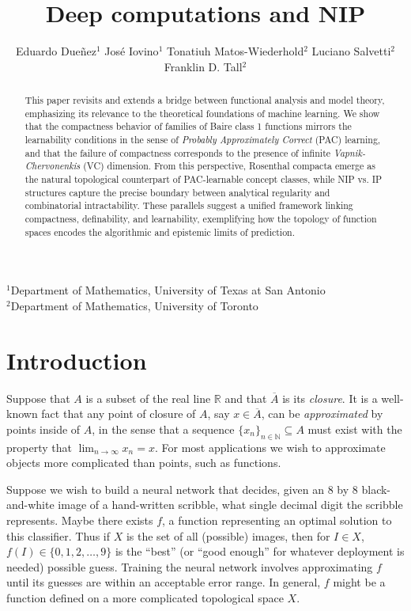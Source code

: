 \documentclass[psamsfonts]{amsart}
\title{Deep computations and NIP}
\author[Dueñez, Iovino, Matos-Wiederhold, Salvetti, Tall]{
Eduardo Dueñez$^{1}$ \qquad
José Iovino$^{1}$ \qquad
Tonatiuh Matos-Wiederhold$^{2}$ \qquad
Luciano Salvetti$^{2}$ \qquad
Franklin D. Tall$^{2}$
}
\theoremstyle{definition}
\theoremstyle{remark}
\numberwithin{equation}{section}
\begin{document}
\maketitle

{\centering\tiny\vspace{-0.6cm}
$^{1}$Department of Mathematics, University of Texas at San Antonio\\
$^{2}$Department of Mathematics, University of Toronto\\
}

\begin{abstract}
This paper revisits and extends a bridge between functional analysis and model theory, emphasizing its relevance to the theoretical foundations of machine learning. We show that the compactness behavior of families of Baire class 1 functions mirrors the learnability conditions in the sense of \emph{Probably Approximately Correct} (PAC) learning, and that the failure of compactness corresponds to the presence of infinite \emph{Vapnik-Chervonenkis} (VC) dimension. From this perspective, Rosenthal compacta emerge as the natural topological counterpart of PAC-learnable concept classes, while NIP vs. IP structures capture the precise boundary between analytical regularity and combinatorial intractability. These parallels suggest a unified framework linking compactness, definability, and learnability, exemplifying how the topology of function spaces encodes the algorithmic and epistemic limits of prediction.
\end{abstract}

\maketitle

\section{Introduction}

Suppose that $A$ is a subset of the real line $\mathbb R$ and that $\overline A$ is its \emph{closure}. It is a well-known fact that any point of closure of $A$, say $x\in\overline A$, can be \emph{approximated} by points inside of $A$, in the sense that a sequence $\{x_n\}_{n\in\mathbb N}\subseteq A$ must exist with the property that $\lim_{n\to\infty}x_n=x$. For most applications we wish to approximate objects more complicated than points, such as functions.

Suppose we wish to build a neural network that decides, given an 8 by 8 black-and-white image of a hand-written scribble, what single decimal digit the scribble represents. Maybe there exists $f$, a function representing an optimal solution to this classifier. Thus if $X$ is the set of all (possible) images, then for $I\in X$, $f(I)\in\{0,1,2,\dots,9\}$ is the ``best'' (or ``good enough'' for whatever deployment is needed) possible guess. Training the neural network involves approximating $f$ until its guesses are within an acceptable error range. In general, $f$ might be a function defined on a more complicated topological space $X$.
\end{document}
